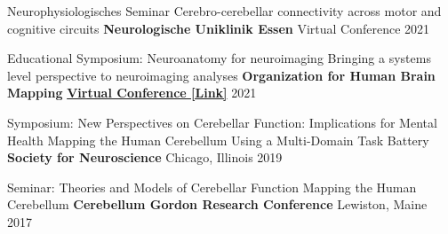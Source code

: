 

\begin{cventries}

  \cventry
    {Neurophysiologisches Seminar} %
    {Cerebro-cerebellar connectivity across motor and cognitive circuits} %
    {\textbf{Neurologische Uniklinik Essen}} %
    {Virtual Conference} %
    {2021} %

  \cventry
    {Educational Symposium: Neuroanatomy for neuroimaging} %
    {Bringing a systems level perspective to neuroimaging analyses} %
    {\textbf{Organization for Human Brain Mapping}} %
    { \href{https://www.youtube.com/watch?v=L6nwkvBqJzI}{\textbf{Virtual Conference [Link]}}} %
    {2021} %
    

  \cventry
    {Symposium: New Perspectives on Cerebellar Function: Implications for Mental Health} %
    {Mapping the Human Cerebellum Using a Multi-Domain Task Battery} %
    {\textbf{Society for Neuroscience}} %
    {Chicago, Illinois} %
    {2019} %
    
    
  \cventry
    {Seminar: Theories and Models of Cerebellar Function} %
    {Mapping the Human Cerebellum} %
    {\textbf{Cerebellum Gordon Research Conference}} %
    {Lewiston, Maine} %
    {2017} %
   
\end{cventries}
